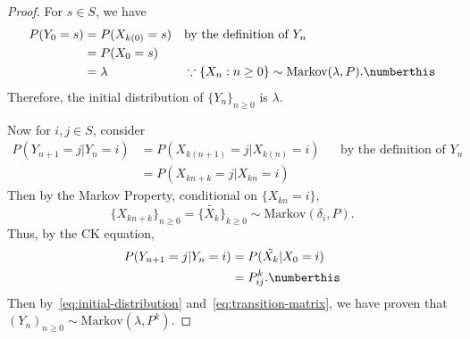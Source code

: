 \documentclass[
  coursecode={MTHE 455},
  assignmentname={Assignment \assignmentnumber},
  studentnumber=20053722,
  name={Bryan Hoang},
  draft,
]{
  ltxanswer%
}
\begin{document}
  \begin{questions}
    \setcounter{question}{\questionnumber}
    \addtocounter{question}{-1}
    \question[4]{}
    \begin{solution}
      \begin{proof}
        For \(s \in S\), we have
        \begin{align*}
          P(Y_{0}=s) &= P(X_{k(0)}=s) & &\text{by the definition of } Y_{n}                                                                \\
                     &= P(X_{0}=s)                                                                                                         \\
                     &= \lambda       & &\because \{X_{n}:n\ge0\} \sim \text{Markov}(\lambda,P).\numberthis\label{eq:initial-distribution}
        \end{align*}
        Therefore, the initial distribution of \(\{Y_{n}\}_{n\ge0}\) is \(\lambda\).

        Now for \(i,j\in S\), consider
        \begin{align*}
          P(Y_{n+1}=j|Y_{n}=i) &= P(X_{k(n+1)}=j|X_{k(n)}=i) & &\text{by the definition of } Y_{n} \\
                               &= P(X_{kn+k}=j|X_{kn}=i)
        \end{align*}
        Then by the Markov Property, conditional on \(\{X_{kn}=i\}\),
        \begin{equation*}
          \{X_{kn+k}\}_{n\ge0}=\{\tilde{X_{k}}\}_{k\ge0}\sim\text{Markov}(\delta_{i},P).
        \end{equation*}
        Thus, by the CK equation,
        \begin{align*}
          P(Y_{n+1}=j|Y_{n}=i) &= P(\tilde{X_{k}}|X_{0}=i)                           \\
                               &= P_{ij}^{k}.\numberthis\label{eq:transition-matrix}
        \end{align*}
        Then by~\eqref{eq:initial-distribution} and~\eqref{eq:transition-matrix}, we have proven that \((Y_{n})_{n\ge0}\sim\text{Markov}(\lambda,P^{k})\).
      \end{proof}
    \end{solution}
  \end{questions}
\end{document}
